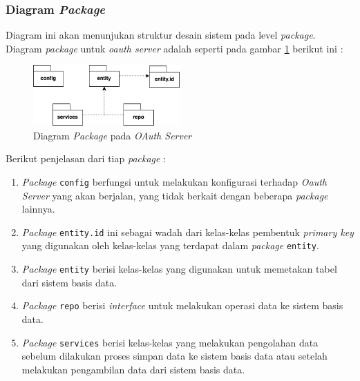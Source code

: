 \documentclass[pdftex,12pt, oneside]{article}
\begin{document}
\subsubsection{Diagram \textit{Package}}

Diagram ini akan menunjukan struktur desain sistem pada level \textit{package}. Diagram \textit{package} untuk \textit{oauth server} adalah seperti pada gambar \ref{fig:package-dia-oauth-server} berikut ini :

\begin{figure}[H]
	\centering
	\includegraphics[width=0.5\textwidth]{./resources/package-dia-oauth-server}
	\caption{Diagram \textit{Package} pada \textit{OAuth Server}}
	\label{fig:package-dia-oauth-server}
\end{figure}

Berikut penjelasan dari tiap \textit{package} :

\begin{enumerate}

	\item \textit{Package} \texttt{config} berfungsi untuk melakukan konfigurasi terhadap \textit{Oauth Server} yang akan berjalan, yang tidak berkait dengan beberapa \textit{package} lainnya.
	
	\item \textit{Package} \texttt{entity.id} ini sebagai wadah dari kelas-kelas pembentuk \textit{primary key} yang digunakan oleh kelas-kelas yang terdapat dalam \textit{package} \texttt{entity}.
	
	\item \textit{Package} \texttt{entity} berisi kelas-kelas yang digunakan untuk memetakan tabel dari sistem basis data.
	
	\item \textit{Package} \texttt{repo} berisi \textit{interface} untuk melakukan operasi data ke sistem basis data.
	
	\item \textit{Package} \texttt{services} berisi kelas-kelas yang melakukan pengolahan data sebelum dilakukan proses simpan data ke sistem basis data atau setelah melakukan pengambilan data dari sistem basis data.
	
\end{enumerate}
\end{document}
